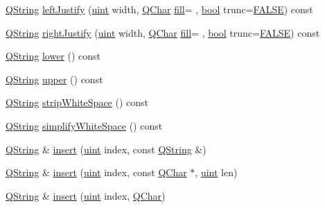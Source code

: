 \begin{DoxyCompactItemize}
\item 
\hyperlink{class_q_string}{Q\+String} \hyperlink{class_q_string_abd0948848e6703606229acf797894eec}{left\+Justify} (\hyperlink{qglobal_8h_a4d3943ddea65db7163a58e6c7e8df95a}{uint} width, \hyperlink{class_q_char}{Q\+Char} \hyperlink{class_q_string_a261151b9ce7096b9af4a9588bb5d038a}{fill}=\textquotesingle{} \textquotesingle{}, \hyperlink{qglobal_8h_a1062901a7428fdd9c7f180f5e01ea056}{bool} trunc=\hyperlink{qglobal_8h_a10e004b6916e78ff4ea8379be80b80cc}{F\+A\+L\+S\+E}) const 
\item 
\hyperlink{class_q_string}{Q\+String} \hyperlink{class_q_string_a8a9704cf0750dad12f0e511a486be695}{right\+Justify} (\hyperlink{qglobal_8h_a4d3943ddea65db7163a58e6c7e8df95a}{uint} width, \hyperlink{class_q_char}{Q\+Char} \hyperlink{class_q_string_a261151b9ce7096b9af4a9588bb5d038a}{fill}=\textquotesingle{} \textquotesingle{}, \hyperlink{qglobal_8h_a1062901a7428fdd9c7f180f5e01ea056}{bool} trunc=\hyperlink{qglobal_8h_a10e004b6916e78ff4ea8379be80b80cc}{F\+A\+L\+S\+E}) const 
\item 
\hyperlink{class_q_string}{Q\+String} \hyperlink{class_q_string_a3c021fcc36dc7bc6055e310edbd2630a}{lower} () const 
\item 
\hyperlink{class_q_string}{Q\+String} \hyperlink{class_q_string_a914ae87825ca65a516fc3c15497e2101}{upper} () const 
\item 
\hyperlink{class_q_string}{Q\+String} \hyperlink{class_q_string_aff97fb4e08966ae5d574d2593695b7e2}{strip\+White\+Space} () const 
\item 
\hyperlink{class_q_string}{Q\+String} \hyperlink{class_q_string_adef912abbdc704e778cc1b3710541ae4}{simplify\+White\+Space} () const 
\item 
\hyperlink{class_q_string}{Q\+String} \& \hyperlink{class_q_string_a3733066010481ab1e8f037bd99045269}{insert} (\hyperlink{qglobal_8h_a4d3943ddea65db7163a58e6c7e8df95a}{uint} index, const \hyperlink{class_q_string}{Q\+String} \&)
\item 
\hyperlink{class_q_string}{Q\+String} \& \hyperlink{class_q_string_aa1047c2887779c9bce2e6c09adf53432}{insert} (\hyperlink{qglobal_8h_a4d3943ddea65db7163a58e6c7e8df95a}{uint} index, const \hyperlink{class_q_char}{Q\+Char} $\ast$, \hyperlink{qglobal_8h_a4d3943ddea65db7163a58e6c7e8df95a}{uint} len)
\item 
\hyperlink{class_q_string}{Q\+String} \& \hyperlink{class_q_string_add1ccd76184e93c88d2941cf6e5cd22e}{insert} (\hyperlink{qglobal_8h_a4d3943ddea65db7163a58e6c7e8df95a}{uint} index, \hyperlink{class_q_char}{Q\+Char})

\end{DoxyCompactItemize}
